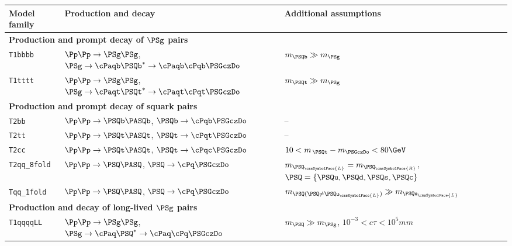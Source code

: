 \begingroup
\renewcommand*{\arraystretch}{1.2}
\begin{table}[!b]
  \label{tab:sms}
  \centering
  \begin{tabular}{ lll }
    \hline
    Model family
    & Production and decay
    & Additional assumptions                                                         \\
    \hline
    \multicolumn{3}{l}{\bf Production and prompt decay of $\PSg$ pairs}           \\
    \texttt{T1bbbb}
    & $\Pp\Pp \to \PSg\PSg$,
    $\PSg\to \cPaqb\PSQb^* \to \cPaqb\cPqb\PSGczDo$
    & $m_{\PSQb} \gg m_{\PSg}$                                                       \\
    \texttt{T1tttt}
    & $\Pp\Pp \to \PSg\PSg$,
    $\PSg\to \cPaqt\PSQt^* \to \cPaqt\cPqt\PSGczDo$                                                                   
    & $m_{\PSQt} \gg m_{\PSg}$                                                       \\
    \multicolumn{3}{l}{\bf Production and prompt decay of squark pairs}           \\
    \texttt{T2bb}
    & $\Pp\Pp \to \PSQb\PASQb$,
    $\PSQb \to \cPqb\PSGczDo$
    & --                                                                             \\
    \texttt{T2tt}
    & $\Pp\Pp \to \PSQt\PASQt$,
    $\PSQt \to \cPqt\PSGczDo$
    & --                                                                             \\
    \texttt{T2cc}
    & $\Pp\Pp \to \PSQt\PASQt$,
    $\PSQt\to \cPqc\PSGczDo$
    & $10 < m_{\,\PSQt} - m_{\PSGczDo} < 80\GeV$                                     \\
    \texttt{T2qq\_8fold}
    & $\Pp\Pp \to \PSQ\PASQ$,
    $\PSQ \to \cPq\PSGczDo$
    & $m_{\PSQ_\cmsSymbolFace{L}} = m_{\PSQ_\cmsSymbolFace{R}}$,
    $\PSQ = \{ \PSQu, \PSQd, \PSQs, \PSQc \}$                                     \\
    \texttt{Tqq\_1fold}
    & $\Pp\Pp \to \PSQ\PASQ$,
    $\PSQ \to \cPq\PSGczDo$
    & $m_{\PSQ (\PSQ \neq \PSQu_\cmsSymbolFace{L})} \gg m_{\PSQu_\cmsSymbolFace{L}}$ \\
    \multicolumn{3}{l}{\bf Production and decay of long-lived $\PSg$ pairs}       \\
    \texttt{T1qqqqLL}
    & $\Pp\Pp \to \PSg\PSg$,
    $\PSg \to \cPaq\PSQ^* \to \cPaq\cPq\PSGczDo$    
    & $m_{\PSQ} \gg m_{\PSg}$, $10^{-3} < c\tau < 10^{5}\unit{mm}$                   \\
    \hline
  \end{tabular}
\end{table}
\endgroup 

